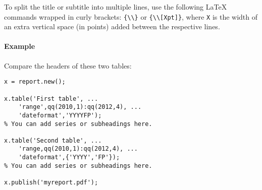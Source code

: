 To split the title or subtitle into multiple lines, use the following
LaTeX commands wrapped in curly brackets:
\texttt{\{\textbackslash{}\textbackslash{}\}} or
\texttt{\{\textbackslash{}\textbackslash{}{[}Xpt{]}\}}, where \texttt{X}
is the width of an extra vertical space (in points) added between the
respective lines.

\paragraph{Example}

Compare the headers of these two tables:

\begin{verbatim}
x = report.new();

x.table('First table', ...
    'range',qq(2010,1):qq(2012,4), ...
    'dateformat','YYYYFP');
% You can add series or subheadings here.

x.table('Second table', ...
    'range,qq(2010,1):qq(2012,4), ...
    'dateformat',{'YYYY','FP'});
% You can add series or subheadings here.

x.publish('myreport.pdf');
\end{verbatim}


